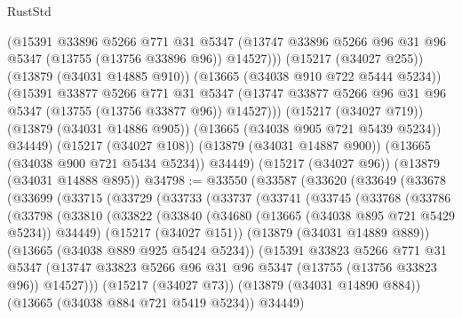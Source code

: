 \begin{lexlean}{RustStd}
\begin{coremodule}
            (@15391
              @33896
              @5266
              @771
              @31
              @5347
              (@13747 @33896 @5266 @96 @31 @96 @5347 (@13755 (@13756 @33896 @96)) @14527)))
          (@15217 (@34027 @255))
          (@13879 (@34031 @14885 @910))
          (@13665 (@34038 @910 @722 @5444 @5234))
          (@15391
            @33877
            @5266
            @771
            @31
            @5347
            (@13747 @33877 @5266 @96 @31 @96 @5347 (@13755 (@13756 @33877 @96)) @14527)))
        (@15217 (@34027 @719))
        (@13879 (@34031 @14886 @905))
        (@13665 (@34038 @905 @721 @5439 @5234))
        @34449)
      (@15217 (@34027 @108))
      (@13879 (@34031 @14887 @900))
      (@13665 (@34038 @900 @721 @5434 @5234))
      @34449)
    (@15217 (@34027 @96))
    (@13879 (@34031 @14888 @895))
@34798 := @33550
    (@33587
      (@33620
        (@33649
          (@33678
            (@33699
              (@33715
                (@33729
                  (@33733
                    (@33737
                      (@33741
                        (@33745
                          (@33768
                            (@33786
                              (@33798
                                (@33810
                                  (@33822
                                    (@33840
                                      (@34680 (@13665 (@34038 @895 @721 @5429 @5234)) @34449)
                                      (@15217 (@34027 @151))
                                      (@13879 (@34031 @14889 @889))
                                      (@13665 (@34038 @889 @925 @5424 @5234))
                                      (@15391
                                        @33823
                                        @5266
                                        @771
                                        @31
                                        @5347
                                        (@13747
                                          @33823
                                          @5266
                                          @96
                                          @31
                                          @96
                                          @5347
                                          (@13755 (@13756 @33823 @96))
                                          @14527)))
                                    (@15217 (@34027 @73))
                                    (@13879 (@34031 @14890 @884))
                                    (@13665 (@34038 @884 @721 @5419 @5234))
                                    @34449)

\end{coremodule}
\end{lexlean}
